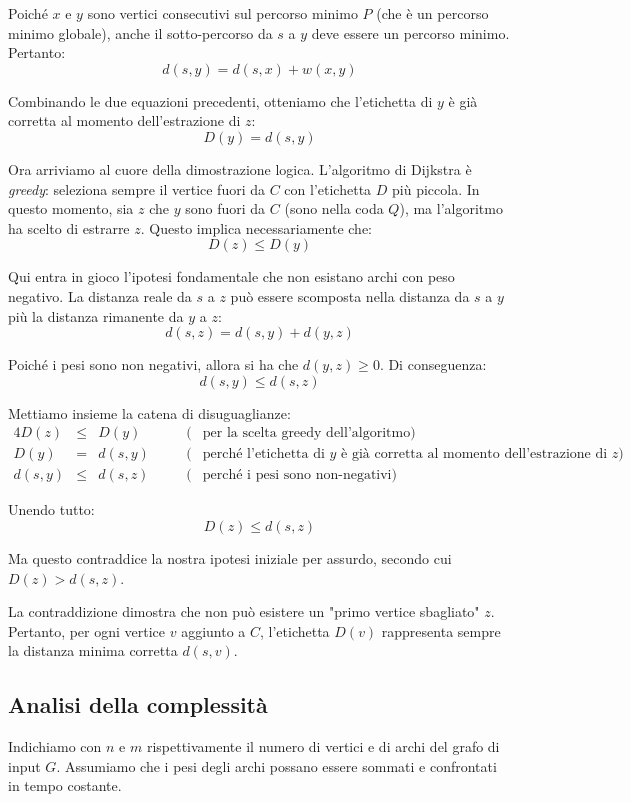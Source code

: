 \noindent
Poiché $x$ e $y$ sono vertici consecutivi sul percorso minimo $P$ (che è un percorso minimo globale), anche il sotto-percorso da $s$ a $y$ deve essere un percorso minimo. Pertanto:
$$ d(s, y) = d(s, x) + w(x, y) $$

\noindent
Combinando le due equazioni precedenti, otteniamo che l'etichetta di $y$ è già corretta al momento dell'estrazione di $z$:
$$ D(y) = d(s, y) $$

\noindent
Ora arriviamo al cuore della dimostrazione logica.
L'algoritmo di Dijkstra è \textit{greedy}: seleziona sempre il vertice fuori da $C$ con l'etichetta $D$ più piccola. In questo momento, sia $z$ che $y$ sono fuori da $C$ (sono nella coda $Q$), ma l'algoritmo ha scelto di estrarre $z$. Questo implica necessariamente che:
$$ D(z) \le D(y) $$

\noindent
Qui entra in gioco l'ipotesi fondamentale che non esistano archi con peso negativo. La distanza reale da $s$ a $z$ può essere scomposta nella distanza da $s$ a $y$ più la distanza rimanente da $y$ a $z$:
$$ d(s, z) = d(s, y) + d(y, z) $$

\noindent
Poiché i pesi sono non negativi, allora si ha che $d(y, z) \ge 0$. Di conseguenza:
$$ d(s, y) \le d(s, z) $$

\noindent
Mettiamo insieme la catena di disuguaglianze:
\begin{alignat*}{4}
    D(z)    &\le{}& D(y)    &\quad& \text{(} &\text{per la scelta greedy dell'algoritmo)} \\
    D(y)    &={} & d(s,y)  &\quad& \text{(} &\text{perché l'etichetta di $y$ è già corretta al momento dell'estrazione di $z$)} \\
    d(s,y)  &\le{}& d(s,z) &\quad& \text{(} &\text{perché i pesi sono non-negativi)}
\end{alignat*}

\noindent
Unendo tutto:
$$ D(z) \le d(s, z) $$

\noindent
Ma questo contraddice la nostra ipotesi iniziale per assurdo, secondo cui $D(z) > d(s, z)$.

\vspace{1\baselineskip}
\noindent
La contraddizione dimostra che non può esistere un "primo vertice sbagliato" $z$. Pertanto, per ogni vertice $v$ aggiunto a $C$, l'etichetta $D(v)$ rappresenta sempre la distanza minima corretta $d(s, v)$.



\subsection{Analisi della complessità}
Indichiamo con $n$ e $m$ rispettivamente il numero di vertici e di archi del grafo di input $G$. Assumiamo che i pesi degli archi possano essere sommati e confrontati in tempo costante. 

